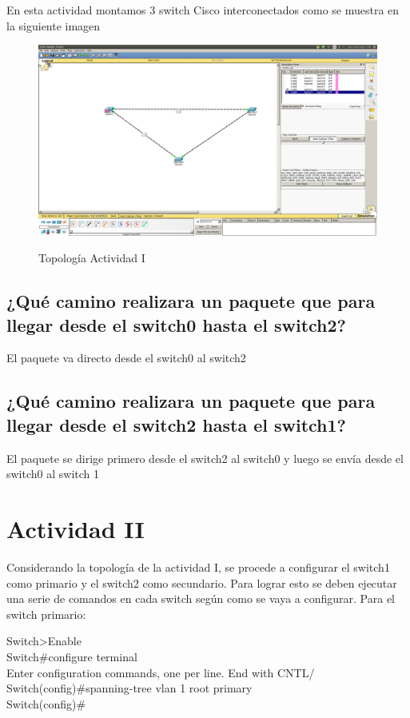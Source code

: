 \documentclass[spanish]{udpreport}
\begin{document}
En esta actividad montamos 3 switch Cisco interconectados como se muestra en la siguiente imagen 
\begin{figure}[H]
	\caption{Topología Actividad I}
	\centering
	\includegraphics[scale=.25]{imagenes/A1.png}
	\label{fig:Figura 2.1}
	\linebreak
\end{figure}

\subsection{¿Qué camino realizara un paquete que para llegar desde el switch0 hasta el switch2?}
El paquete va directo desde el switch0 al switch2
\subsection{¿Qué camino realizara un paquete que para llegar desde el switch2 hasta el switch1?}
El paquete se dirige primero desde el switch2 al switch0 y luego se envía desde el switch0 al switch 1

\section{Actividad II}
Considerando la topología de la actividad I, se procede a configurar el switch1 como primario y el switch2 como secundario. Para lograr esto se deben ejecutar una serie de comandos en cada switch según como se vaya a configurar.
Para el switch primario:
\begin{flushleft}
	Switch>Enable \\
	Switch\#configure terminal \\
	Enter configuration commands, one per line. End with CNTL/ \\
	Switch(config)\#spanning-tree vlan 1 root primary \\
	Switch(config)\# \\
\end{flushleft}
\end{document}
